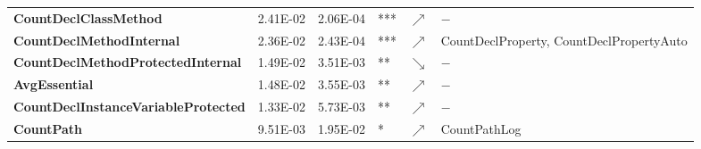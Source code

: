 \begin{sidewaystable}
\begin{tabularx}{\columnwidth}{>{\bfseries}lrrlcl}
CountDeclClassMethod & 2.41E-02 & 2.06E-04
 & *** & $\nearrow$ &             $-$                                                                                                                                                                                                                                                                                                                                                     \\
CountDeclMethodInternal & 2.36E-02 & 2.43E-04
 & *** & $\nearrow$ & CountDeclProperty, CountDeclPropertyAuto                                                                                                                                                                                                                                                                                                                        \\
CountDeclMethodProtectedInternal & 1.49E-02 & 3.51E-03
 & **  & $\searrow$ &         $-$                                                                                                                                                                                                                                                                                                                                                         \\
AvgEssential & 1.48E-02 & 3.55E-03 & **  & $\nearrow$ &   $-$                                                                                                                                                                                                                                                                                                                                                               \\
CountDeclInstanceVariableProtected & 1.33E-02 & 5.73E-03
 & **  & $\nearrow$ &   $-$                                                                                                                                                                                                                                                                                                                                                               \\
CountPath & 9.51E-03 & 1.95E-02
 & *   & $\nearrow$ & CountPathLog                                                                                                                                                                                                                                                                                                                                                    \\

\end{tabularx}
\end{sidewaystable}
